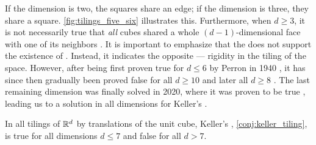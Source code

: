 \documentclass[../thesis.tex]{subfiles}
\begin{document}
If the dimension is two, the squares share an edge; if the dimension is three, they share a square. \cref{fig:tilings_five_six} illustrates this. Furthermore, when $d\geq 3$, it is not necessarily true that \emph{all} cubes shared a whole $(d-1)$-dimensional face with one of its neighbors \cite{perronUeberLueckenloseAusfuellung1940}. It is important to emphasize that the  does not support the existence of . Instead, it indicates the opposite — rigidity in the tiling of the space.
However, after being first proven true for $d\leq 6$ by Perron in 1940 \cite{perronModulartigeLueckenloseAusfuellung1940,perronModulartigeLueckenloseAusfuellung1940a}, it has since then gradually been proved false for all $d\geq10$ \cite{lagariasKellerCubetilingConjecture1992} and later all $d\geq8$ \cite{mackeyCubeTilingDimension2002}. The last remaining dimension was finally solved in 2020, where it was proven to be true \cite{brakensiekResolutionKellerConjecture2020}, leading us to a solution in all dimensions for Keller's .%

\begin{theorem}
    In all tilings of $\mathbb{R}^d$ by translations of the unit cube, Keller's , \cref{conj:keller_tiling}, is true for all dimensions $d\leq 7$ and false for all $d>7$.
\end{theorem}
\end{document}
